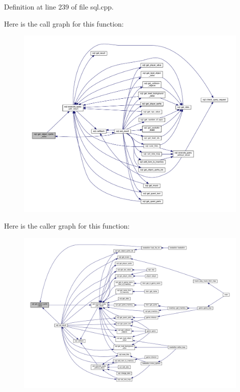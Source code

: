 Definition at line 239 of file sql.\+cpp.

Here is the call graph for this function\+:
\nopagebreak
\begin{figure}[H]
\begin{center}
\leavevmode
\includegraphics[width=350pt]{classsql_a2466fe5b0ec24e98190ee5763a4a69d1_cgraph}
\end{center}
\end{figure}
Here is the caller graph for this function\+:
\nopagebreak
\begin{figure}[H]
\begin{center}
\leavevmode
\includegraphics[width=350pt]{classsql_a2466fe5b0ec24e98190ee5763a4a69d1_icgraph}
\end{center}
\end{figure}
\mbox{\label{classsql_a370d018617316ff6489cbb97565b7af9}} 
